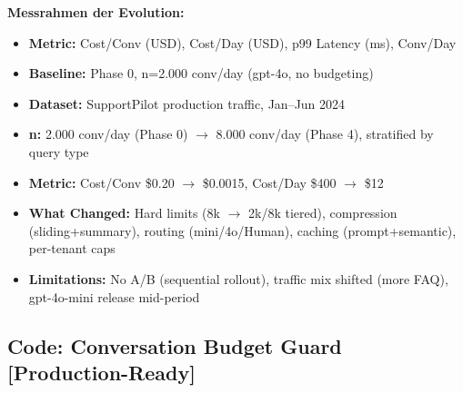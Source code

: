 \textbf{Messrahmen der Evolution:}
\begin{itemize}[leftmargin=*]
  \item \textbf{Metric:} Cost/Conv (USD), Cost/Day (USD), p99 Latency (ms), Conv/Day
  \item \textbf{Baseline:} Phase 0, n=2.000 conv/day (gpt-4o, no budgeting)
  \item \textbf{Dataset:} SupportPilot production traffic, Jan–Jun 2024
  \item \textbf{n:} 2.000 conv/day (Phase 0) $\to$ 8.000 conv/day (Phase 4), stratified by query type
  \item \textbf{Metric:} Cost/Conv \$0.20 $\to$ \$0.0015, Cost/Day \$400 $\to$ \$12
  \item \textbf{What Changed:} Hard limits (8k $\to$ 2k/8k tiered), compression (sliding+summary), routing (mini/4o/Human), caching (prompt+semantic), per-tenant caps
  \item \textbf{Limitations:} No A/B (sequential rollout), traffic mix shifted (more FAQ), gpt-4o-mini release mid-period
\end{itemize}

\subsection{Code: Conversation Budget Guard [Production-Ready]}
\label{sec:conv_budget_guard}

